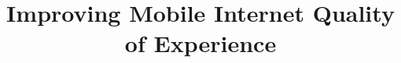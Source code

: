 \documentclass{sig-alternate}
\begin{document}
\title{Improving Mobile Internet Quality of Experience}

\maketitle





\end{document}
